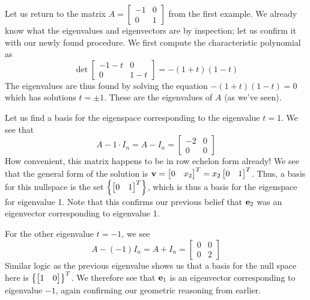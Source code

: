 \documentclass[colorful]{notes}
\begin{document}
    \begin{example}
        Let us return to the matrix $A = \begin{bmatrix} -1 & 0 \\ 0 & 1 \end{bmatrix}$ from the first example. We already know what the eigenvalues and eigenvectors are by inspection; let us confirm it with our newly found procedure. We first compute the characteristic polynomial as 
        \begin{equation*}
            \det \begin{bmatrix}
                -1 -t & 0 \\ 0 & 1 - t
            \end{bmatrix} = -(1 + t)(1 - t)
        \end{equation*}
        The eigenvalues are thus found by solving the equation $-(1+t)(1-t) = 0$ which has solutions $t = \pm 1$. These are the eigenvalues of $A$ (as we've seen). 

        Let us find a basis for the eigenspace corresponding to the eigenvalue $t = 1$. We see that 
        \begin{equation*}
            A - 1 \cdot I_n = A - I_n = \begin{bmatrix}
                -2 & 0 \\ 0 & 0 
            \end{bmatrix}
        \end{equation*}
        How convenient, this matrix happens to be in row echelon form already! We see that the general form of the solution is $\mathbf{v} = \begin{bmatrix} 0 & x_2 \end{bmatrix}^T = x_2 \begin{bmatrix} 0 & 1 \end{bmatrix}^T$. Thus, a basis for this nullspace is the set $\left\{ \begin{bmatrix} 0 & 1 \end{bmatrix}^T \right\}$, which is thus a basis for the eigenspace for eigenvalue 1. Note that this confirms our previous belief that $\mathbf{e}_2$ was an eigenvector corresponding to eigenvalue 1. 

        For the other eigenvalue $t = -1$, we see 
        \begin{equation*}
            A - (-1)I_n = A + I_n = \begin{bmatrix}
                0 & 0 \\ 0 & 2
            \end{bmatrix}
        \end{equation*}
        Similar logic as the previous eigenvalue shows us that a basis for the null space here is $\left\{ \begin{bmatrix} 1 & 0 \end{bmatrix} \right\}^T$. We therefore see that $\mathbf{e}_1$ is an eigenvector corresponding to eigenvalue $-1$, again confirming our geometric reasoning from earlier.
    \end{example}
\end{document}
